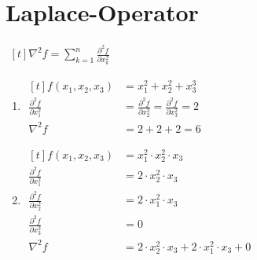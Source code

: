 \setcounter{section}{2}
\section{Laplace-Operator}

$\begin{aligned}[t]
		\nabla ^ 2 f = \sum_{k=1}^n \frac{\partial^2 f}{\partial x^2_k}
	\end{aligned}$

\begin{enumerate}
	\setlength\itemsep{2em}
	\item
	      $
		      \begin{aligned}[t]
			      f(x_1,x_2,x_3)                      & = x_1^2 + x_2^2 + x_3^3 \\
			      \frac{\partial^2 f}{\partial x^2_1} &
			      = \frac{\partial^2 f}{\partial x^2_2}
			      = \frac{\partial^2 f}{\partial x^2_3} = 2                     \\
			      \nabla ^ 2 f                        & = 2 + 2 + 2 =  6
		      \end{aligned}
	      $

	\item
	      $
		      \begin{aligned}[t]
			      f(x_1,x_2,x_3)                      & = x_1^2 \cdot x_2^2 \cdot x_3                           \\
			      \frac{\partial^2 f}{\partial x^2_1} & = 2 \cdot x_2^2 \cdot x_3                               \\
			      \frac{\partial^2 f}{\partial x^2_2} & = 2 \cdot x_1^2 \cdot x_3                               \\
			      \frac{\partial^2 f}{\partial x^2_3} & = 0                                                     \\
			      \nabla ^ 2 f                        & = 2 \cdot x_2^2 \cdot x_3 + 2 \cdot x_1^2 \cdot x_3 + 0
		      \end{aligned}
	      $
\end{enumerate}
